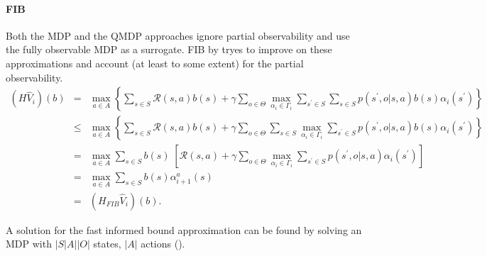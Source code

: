 \paragraph{FIB}
Both the MDP and the QMDP approaches ignore partial observability and use the fully
observable MDP as a surrogate. FIB by \cite{10.5555/1867406.1867520} tryes to improve on these approximations and account (at least to
some extent) for the partial observability.
\[
\begin{array}{lcl}
\left(H\widehat{V}_{i}\right)\left(b\right) & = & \max\limits_{a\in A}\left\{ \sum\limits_{s\in S}\mathcal{R}\left(s,a\right)b\left(s\right)+\gamma\sum\limits_{o\in\Theta}\max\limits_{\alpha_{i}\in\Gamma_{i}}\sum\limits_{s^{\prime}\in S}\sum\limits_{s\in S}p\left(s^{\prime},o|s,a\right)b\left(s\right)\alpha_{i}\left(s^{\prime}\right)\right\} \\
& \leq & \max\limits_{a\in A}\left\{ \sum\limits_{s\in S}\mathcal{R}\left(s,a\right)b\left(s\right)+\gamma\sum\limits_{o\in\Theta}\sum\limits_{s\in S}\max\limits_{\alpha_{i}\in\Gamma_{i}}\sum\limits_{s^{\prime}\in S}p\left(s^{\prime},o|s,a\right)b\left(s\right)\alpha_{i}\left(s^{\prime}\right)\right\} \\
& = & \max\limits_{a\in A}\sum\limits_{s\in S}b\left(s\right)\;\left[\mathcal{R}\left(s,a\right)+\gamma\sum\limits_{o\in\Theta}\max\limits_{\alpha_{i}\in\Gamma_{i}}\sum\limits_{s^{\prime}\in S}p\left(s^{\prime},o|s,a\right)\alpha_{i}\left(s^{\prime}\right)\right] \\
& = & \max\limits_{a\in A}\sum\limits_{s\in S}b\left(s\right)\alpha_{i+1}^{a}\left(s\right) \\
& = & \left(H_{FIB}\widehat{V}_{i}\right)\left(b\right).
\end{array}
\]

\begin{remark}
    A solution for the fast informed bound approximation can be found by solving an MDP with 
    $|S|A||O|$ states, $|A|$ actions (\cite{Hauskrecht_2000}).
\end{remark}

